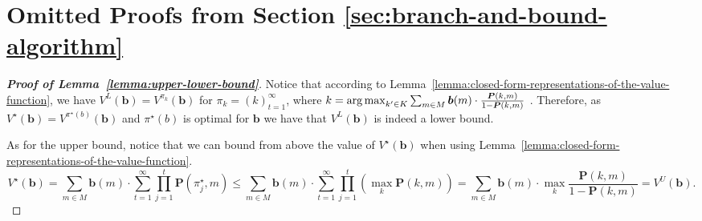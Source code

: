 \section{Omitted Proofs from Section \ref{sec:branch-and-bound-algorithm}}

\label{sec:branch-and-bound-algorithm-proofs}

\begin{proof}[\normalfont\bfseries Proof of Lemma~\ref{lemma:upper-lower-bound}]
    Notice that according to Lemma~\ref{lemma:closed-form-representations-of-the-value-function}, we have $V^L(\bm b) = V^{\pi_k}(\bm b)$ for $\pi_k = \left( k \right)_{t=1}^{\infty}$, where $k = \operatorname*{arg\,max}_{k' \in K} \sum_{m \in M} \bm{b}(m) \cdot \frac{\bm{P}(k, m)}{1 - \bm{P}(k, m)}$ . Therefore, as $V^\star(\bm b) = V^{\pi^\star(b)}(\bm b)$ and  $\pi^\star(b)$ is optimal for $\bm b$ we have that $V^L(\bm b)$ is indeed a lower bound.

    As for the upper bound, notice that we can bound from above the value of $V^\star(\bm b)$ when using Lemma~\ref{lemma:closed-form-representations-of-the-value-function}.
    {
    \small
    \[
        V^\star(\bm{b}) = \sum_{m \in M} \bm{b}(m) \cdot \sum_{t=1}^{\infty} \prod_{j=1}^{t} \bm{P}(\pi^\star_j, m) \leq \sum_{m \in M} \bm{b}(m) \cdot \sum_{t=1}^{\infty} \prod_{j=1}^{t} \left( \max_{k} \bm{P}(k, m) \right) = \sum_{m \in M} \bm{b}(m) \cdot \max_{k} \frac{\bm{P}(k, m)}{1 - \bm{P}(k, m)} = V^{U}(\bm{b}).
    \]
    }
\end{proof}


